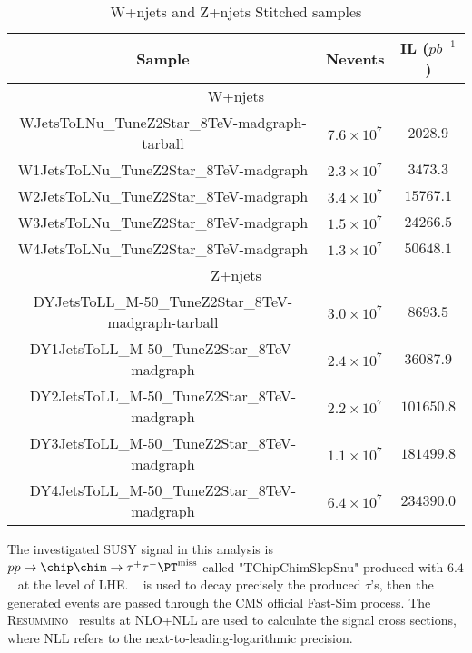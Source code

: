 \begin{table}[!h]
\begin{center}
\caption{W+njets and Z+njets Stitched samples}
\begin{tabular}{|c|c|c|}
\hline\hline
Sample    & Nevents  & IL ($pb^{-1}$) \\ \hline
\multicolumn{3}{|c|}{W+njets} \\\hline
WJetsToLNu\_TuneZ2Star\_8TeV-madgraph-tarball     & $7.6\times 10^{7}$ & $2028.9$  \\ \hline
W1JetsToLNu\_TuneZ2Star\_8TeV-madgraph            & $2.3\times 10^{7}$ & $3473.3$  \\ \hline
W2JetsToLNu\_TuneZ2Star\_8TeV-madgraph            & $3.4\times 10^{7}$ & $15767.1$ \\ \hline
W3JetsToLNu\_TuneZ2Star\_8TeV-madgraph            & $1.5\times 10^{7}$ & $24266.5$ \\ \hline
W4JetsToLNu\_TuneZ2Star\_8TeV-madgraph            & $1.3\times 10^{7}$ & $50648.1$ \\ \hline
\multicolumn{3}{|c|}{Z+njets} \\\hline
DYJetsToLL\_M-50\_TuneZ2Star\_8TeV-madgraph-tarball & $3.0\times 10^{7}$ & $8693.5$ \\ \hline
DY1JetsToLL\_M-50\_TuneZ2Star\_8TeV-madgraph        & $2.4\times 10^{7}$ & $36087.9$\\ \hline
DY2JetsToLL\_M-50\_TuneZ2Star\_8TeV-madgraph        & $2.2\times 10^{7}$ & $101650.8$\\ \hline
DY3JetsToLL\_M-50\_TuneZ2Star\_8TeV-madgraph        & $1.1\times 10^{7}$ & $181499.8$\\ \hline
DY4JetsToLL\_M-50\_TuneZ2Star\_8TeV-madgraph        & $6.4\times 10^{7}$ & $234390.0$\\ \hline
\hline
\end{tabular}
\label{Tab.Stitching}
\end{center}
\end{table}


The investigated SUSY signal in this analysis is {\small $pp \rightarrow \chip \chim \rightarrow \tau^+ \tau^- \MPT$} called {\small "TChipChimSlepSnu"} produced with \PYTHIA $6.4$ ~\cite{PYTHIA} at the level of LHE. \TAUOLA ~\cite{TAUOLA} is used to decay precisely the produced $\tau$'s, then the generated events are passed through the CMS official Fast-Sim process.
The \textsc{Resummino}~\cite{Fuks:2012qx,Fuks:2013vua,Fuks:2013lya} results at NLO+NLL are used to calculate the signal cross sections, where 
NLL refers to the next-to-leading-logarithmic precision.


